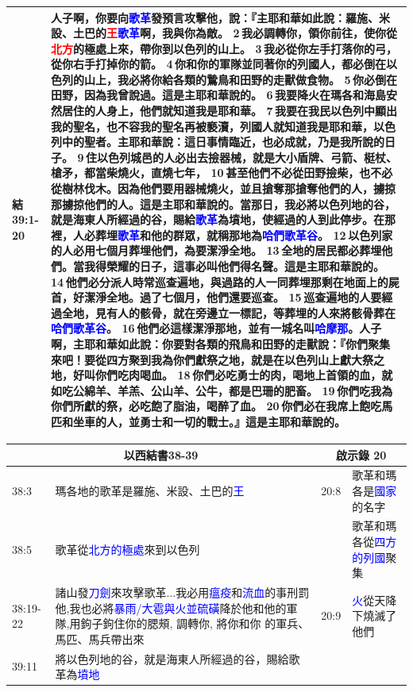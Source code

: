 \begin{table}[H]
\begin{tabular}{p{}|p{16.5cm}}
結39:1-20&人子啊，你要向\textcolor{blue}{歌革}發預言攻擊他，說：『主耶和華如此說：羅施、米設、土巴的\textcolor{red}{王}\textcolor{blue}{歌革}啊，我與你為敵。 2 我必調轉你，領你前往，使你從\textcolor{red}{北方}的極處上來，帶你到以色列的山上。 3 我必從你左手打落你的弓，從你右手打掉你的箭。 4 你和你的軍隊並同著你的列國人，都必倒在以色列的山上，我必將你給各類的鷙鳥和田野的走獸做食物。 5 你必倒在田野，因為我曾說過。這是主耶和華說的。 6 我要降火在瑪各和海島安然居住的人身上，他們就知道我是耶和華。 7 我要在我民以色列中顯出我的聖名，也不容我的聖名再被褻瀆，列國人就知道我是耶和華，以色列中的聖者。主耶和華說：這日事情臨近，也必成就，乃是我所說的日子。 9 住以色列城邑的人必出去撿器械，就是大小盾牌、弓箭、梃杖、槍矛，都當柴燒火，直燒七年， 10 甚至他們不必從田野撿柴，也不必從樹林伐木。因為他們要用器械燒火，並且搶奪那搶奪他們的人，擄掠那擄掠他們的人。這是主耶和華說的。當那日，我必將以色列地的谷，就是海東人所經過的谷，賜給\textcolor{blue}{歌革}為墳地，使經過的人到此停步。在那裡，人必葬埋\textcolor{blue}{歌革}和他的群眾，就稱那地為\textcolor{blue}{哈們歌革谷}。 12 以色列家的人必用七個月葬埋他們，為要潔淨全地。 13 全地的居民都必葬埋他們。當我得榮耀的日子，這事必叫他們得名聲。這是主耶和華說的。 14 他們必分派人時常巡查遍地，與過路的人一同葬埋那剩在地面上的屍首，好潔淨全地。過了七個月，他們還要巡查。 15 巡查遍地的人要經過全地，見有人的骸骨，就在旁邊立一標記，等葬埋的人來將骸骨葬在\textcolor{blue}{哈們歌革谷}。 16 他們必這樣潔淨那地，並有一城名叫\textcolor{blue}{哈摩那}。人子啊，主耶和華如此說：你要對各類的飛鳥和田野的走獸說：『你們聚集來吧！要從四方聚到我為你們獻祭之地，就是在以色列山上獻大祭之地，好叫你們吃肉喝血。 18 你們必吃勇士的肉，喝地上首領的血，就如吃公綿羊、羊羔、公山羊、公牛，都是巴珊的肥畜。 19 你們吃我為你們所獻的祭，必吃飽了脂油，喝醉了血。 20 你們必在我席上飽吃馬匹和坐車的人，並勇士和一切的戰士。』這是主耶和華說的。\\\hline
\end{tabular}
\end{table}

\begin{table}[H]
\centering
\begin{tabular}{p{.8cm}|p{}|p{.7cm}|p{4.75cm}}\hline\hline
 \multicolumn{2}{c|}{以西結書38-39}&\multicolumn{2}{c}{啟示錄 20}\\\hline
38:3&瑪各地的歌革是羅施、米設、土巴的\textcolor{blue}{王}&20:8&歌革和瑪各是\textcolor{blue}{國家}的名字\\\hline
38:5&歌革從\textcolor{blue}{北方的極處}來到以色列&&歌革和瑪各從\textcolor{blue}{四方的列國}聚集\\\hline
38:19-22&諸山發\textcolor{blue}{刀劍}來攻擊歌革...我必用\textcolor{blue}{瘟疫}和\textcolor{blue}{流血}的事刑罰他,我也必將\textcolor{blue}{暴雨/大雹與火並硫磺}降於他和他的軍隊,用鉤子鉤住你的腮頰, 調轉你, 將你和你
的軍兵、馬匹、馬兵帶出來&20:9&\textcolor{blue}{火}從天降下燒滅了他們\\\hline
39:11&將以色列地的谷，就是海東人所經過的谷，賜給歌革為\textcolor{blue}{墳地}&&\\\hline
\end{tabular}
\end{table}



